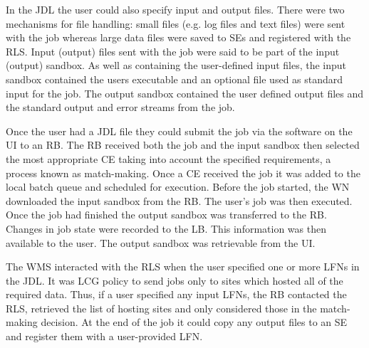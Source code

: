 In the JDL the user could also specify input and output files. There were two mechanisms for file handling: small files (e.g. log files and text files) were sent with the job whereas large data files were saved to SEs and registered with the RLS. Input (output) files sent with the job were said to be part of the input (output) sandbox. As well as containing the user-defined input files, the input sandbox contained the users executable and an optional file used as standard input for the job. The output sandbox contained the user defined output files and the standard output and error streams from the job.

Once the user had a JDL file they could submit the job via the software on the UI to an RB. The RB received both the job and the input sandbox then selected the most appropriate CE taking into account the specified requirements, a process known as match-making. Once a CE received the job it was added to the local batch queue and scheduled for execution. Before the job started, the WN downloaded the input sandbox from the RB. The user's job was then executed. Once the job had finished the output sandbox was transferred to the RB. Changes in job state were recorded to the LB. This information was then available to the user. The output sandbox was retrievable from the UI.

The WMS interacted with the RLS when the user specified one or more LFNs in the JDL. It was LCG policy to send jobs only to sites which hosted all of the required data. Thus, if a user specified any input LFNs, the RB contacted the RLS, retrieved the list of hosting sites and only considered those in the match-making decision. At the end of the job it could copy any output files to an SE and register them with a user-provided LFN.



